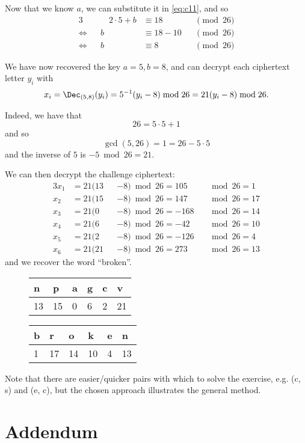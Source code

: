 \documentclass{practice}
\begin{document}
Now that we know $a$, we can substitute it in \eqref{eq:c11}, and so
\begin{alignat*}{3}
  &&\quad
  2 \cdot 5 + b &\equiv 18 &&\pmod{26}\\
  \Leftrightarrow&&
  b &\equiv 18 - 10 &&\pmod{26}\\
  \Leftrightarrow&&
  b &\equiv 8 &&\pmod{26}
\end{alignat*}

We have now recovered the key $a = 5, b = 8$, and can decrypt each ciphertext letter $y_i$ with
\[
  x_i = \Dec_{(5,8)}(y_i) = 5^{-1}(y_i - 8) \bmod{26}
  = 21(y_i - 8) \bmod{26}.
\]

Indeed, we have that
\[
  26 = 5 \cdot 5 + 1
\]
and so
\[
  \gcd(5, 26) = 1 = 26 - 5 \cdot 5
\]
and the inverse of $5$ is $-5 \bmod{26} = 21$.

We can then decrypt the challenge ciphertext:
\begin{alignat*}{3}
  x_1 &= 21(13 &&- 8) \bmod 26 = 105  &&\bmod 26 = 1\\
  x_2 &= 21(15 &&- 8) \bmod 26 = 147  &&\bmod 26 = 17\\
  x_3 &= 21(0  &&- 8)  \bmod 26 = -168 &&\bmod 26 = 14\\
  x_4 &= 21(6  &&- 8)  \bmod 26 = -42  &&\bmod 26 = 10\\
  x_5 &= 21(2  &&- 8)  \bmod 26 = -126 &&\bmod 26 = 4\\
  x_6 &= 21(21 &&- 8) \bmod 26 = 273  &&\bmod 26 = 13
\end{alignat*}
and we recover the word \enquote{broken}.

\begin{figure}[h!]
  \centering
  \begin{tabular}{@{}C{1em}C{1em}C{1em}C{1em}C{1em}C{1em}@{}}
    n & p & a & g & c & v\\ & 15 & 0 & 6 & 2 & 21
  \end{tabular}
  \hspace*{1cm}
  \begin{tabular}{@{}C{1em}C{1em}C{1em}C{1em}C{1em}C{1em}@{}}
    b & r & o & k & e & n\\ & 17 & 14 & 10 & 4 & 13
  \end{tabular}
\end{figure}

Note that there are easier/quicker pairs with which to solve the exercise, e.g. (c, s) and (e, c), but the chosen approach illustrates the general method.

\section*{Addendum}\label{sec:addendum}
\end{document}
